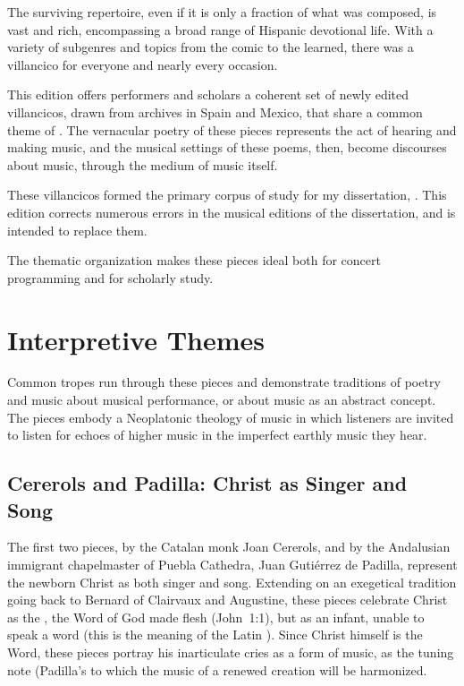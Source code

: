 The surviving repertoire, even if it is only a fraction of what was composed, is vast and rich, encompassing a broad range of Hispanic devotional life.
With a variety of subgenres and topics from the comic to the learned, there was a villancico for everyone and nearly every occasion.

This edition offers performers and scholars a coherent set of newly edited villancicos, drawn from archives in Spain and Mexico, that share a common theme of .
The vernacular poetry of these  pieces represents the act of hearing and making music, and the musical settings of these poems, then, become discourses about music, through the medium of music itself.%
  \begin{Footnote}
  These villancicos formed the primary corpus of study for my dissertation, \citemydiss.
  This edition corrects numerous errors in the musical editions of the dissertation, and is intended to replace them.
  \end{Footnote}
The thematic organization makes these pieces ideal both for concert programming and for scholarly study.

\section{Interpretive Themes}

Common tropes run through these pieces and demonstrate traditions of poetry and music about musical performance, or about music as an abstract concept.
The pieces embody a Neoplatonic theology of music in which listeners are invited to listen for echoes of higher music in the imperfect earthly music they hear.

\subsection{Cererols and Padilla: Christ as Singer and Song}

The first two pieces,  by the Catalan monk Joan Cererols, and  by the Andalusian immigrant chapelmaster of Puebla Cathedra, Juan Gutiérrez de Padilla, represent the newborn Christ as both singer and song. 
Extending on an exegetical tradition going back to Bernard of Clairvaux and Augustine, these pieces celebrate Christ as the , the Word of God made flesh (John~1:1), but as an infant, unable to speak a word (this is the meaning of the Latin ). 
Since Christ himself is the Word, these pieces portray his inarticulate cries as a form of music, as the tuning note (Padilla's  to which the music of a renewed creation will be harmonized.


